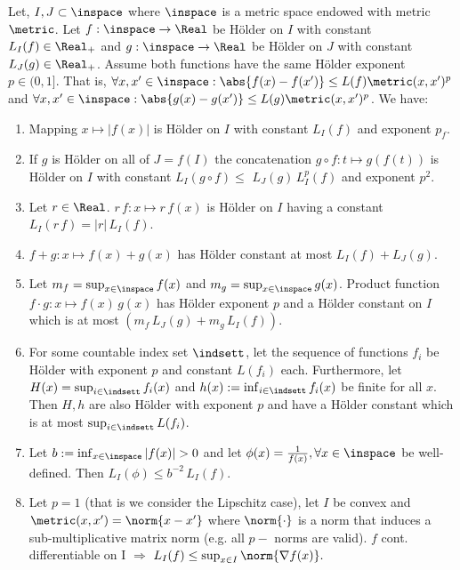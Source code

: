 \begin{lem} \label{lem:Hoeldarithmetic}
Let, $I,J \subset \inspace$ where $\inspace$ is a metric space endowed with metric $\metric$. Let $f : \inspace \to \Real$ be H\"older on $I$ with constant $L_I (f) \in \Real_+$ 
and $g :\inspace \to \Real$ be H\"older on $J$ with constant $L_J (g) \in \Real_+$. Assume both functions have the same H\"older exponent $p \in (0,1]$. That is, $\forall x, x' \in \inspace: \abs{f(x)-f(x')} \leq L(f) \metric(x,x')^p$ and  $\forall x, x' \in \inspace: \abs{g(x)-g(x')} \leq L(g)  \metric(x,x')^p$.
We have:

\begin{enumerate}
	\item Mapping $x \mapsto |f(x)|$ is H\"older on $I$ with constant $L_I(f)$ and exponent $p_f$.
	\item If $g$ is H\"older on all of $J=f(I)$ the concatenation $g \circ f: t \mapsto g(f(t))$ is H\"older on $I$ with constant 
	      $L_I(g \circ f) \leq$ $L_J (g) \, L_I^p(f)$ and exponent $p^2$.
	\item Let $r \in \Real$. $r \, f: x \mapsto r \, f(x)$ is H\"older on $I$ having a constant $L_I (r \,f) = |r| \, L_I(f)$.
	\item $f+g: x \mapsto f(x) + g(x)$ has H\"older constant at most $L_I(f) + L_J(g)$.
	\item Let $m_f = \sup_{x\in \inspace } f(x)$ and $m_g = \sup_{x \in \inspace } g(x)$. Product function $f\cdot g: x \mapsto f(x) \, g(x)$ has H\"older exponent $p$ and a H\"older constant on $I$ which is at most $(m_f \, L_J(g)+ m_g \, L_I(f))$.
	\item For some countable index set $\indsett$, let the sequence of functions $f_i$ be H\"older with exponent $p$ and constant $L(f_i)$ each. Furthermore, let $H(x) =\sup_{i \in \indsett} f_i(x) $ and $h(x) := \inf_{i \in \indsett} f_i(x)$ be finite for all $x$. Then $H,h$ are also H\"older with exponent $p$ and have a H\"older constant which is at most $\sup_{i \in \indsett} L(f_i)$.
	\item Let $b := \inf_{x \in \inspace }| f(x)| > 0$ and let 
	$\phi(x) = \frac{1}{f(x)}, \forall x \in \inspace$ be well-defined.  
	      Then $L_I(\phi) \leq b^{-2} \, L_I(f)$.  
	\item Let $p=1$ (that is we consider the Lipschitz case), let $I$ be convex and $\metric(x,x') = \norm{x-x'}$ where $\norm{\cdot}$ is a norm that induces a sub-multiplicative matrix norm (e.g. all $p-$ norms are valid). $f$ cont. differentiable on I $\Rightarrow$ $L_I(f) \leq \sup_{x \in I } \norm{\nabla f(x)}. $ 

\end{enumerate}
\end{lem}
